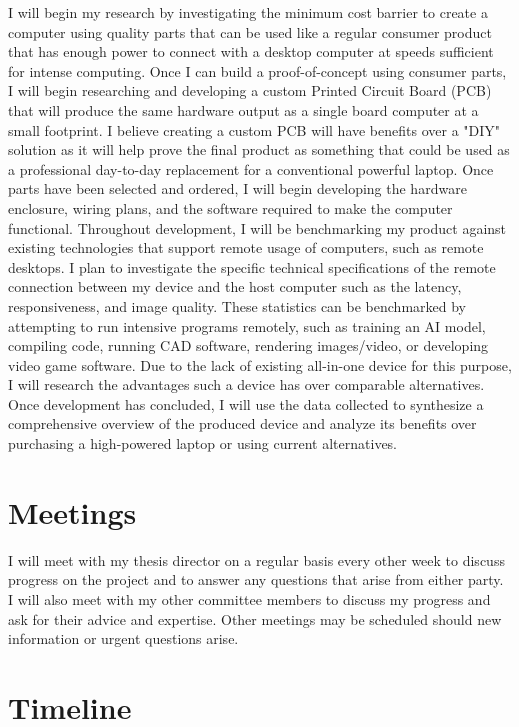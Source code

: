 \documentclass[11pt]{article}
\begin{document}
I will begin my research by investigating the minimum cost barrier to create a computer using quality parts that can be used like a regular consumer product that has enough power to connect with a desktop computer at speeds sufficient for intense computing.
Once I can build a proof-of-concept using consumer parts, I will begin researching and developing a custom Printed Circuit Board (PCB) that will produce the same hardware output as a single board computer at a small footprint.
I believe creating a custom PCB will have benefits over a "DIY" solution as it will help prove the final product as something that could be used as a professional day-to-day replacement for a conventional powerful laptop.
Once parts have been selected and ordered, I will begin developing the hardware enclosure, wiring plans, and the software required to make the computer functional.
Throughout development, I will be benchmarking my product against existing technologies that support remote usage of computers, such as remote desktops.
I plan to investigate the specific technical specifications of the remote connection between my device and the host computer such as the latency, responsiveness, and image quality.
These statistics can be benchmarked by attempting to run intensive programs remotely, such as training an AI model, compiling code, running CAD software, rendering images/video, or developing video game software.
Due to the lack of existing all-in-one device for this purpose, I will research the advantages such a device has over comparable alternatives.
Once development has concluded, I will use the data collected to synthesize a comprehensive overview of the produced device and analyze its benefits over purchasing a high-powered laptop or using current alternatives.

\section*{Meetings}

I will meet with my thesis director on a regular basis every other week to discuss progress on the project and to answer any questions that arise from either party.
I will also meet with my other committee members to discuss my progress and ask for their advice and expertise.
Other meetings may be scheduled should new information or urgent questions arise.

\section*{Timeline}
\end{document}
